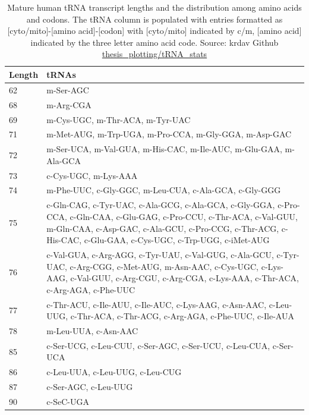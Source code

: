 \begin{table}[!htb]
\begin{tabular}{|l|p{}|}
\hline
Length & tRNAs \\ \hline
62     & m-Ser-AGC \\ \hline
68     & m-Arg-CGA \\ \hline
69     & m-Cys-UGC, m-Thr-ACA, m-Tyr-UAC \\ \hline
71     & m-Met-AUG, m-Trp-UGA, m-Pro-CCA, m-Gly-GGA, m-Asp-GAC \\ \hline
72     & m-Ser-UCA, m-Val-GUA, m-His-CAC, m-Ile-AUC, m-Glu-GAA, m-Ala-GCA \\ \hline
73     & c-Cys-UGC, m-Lys-AAA \\ \hline
74     & m-Phe-UUC, c-Gly-GGC, m-Leu-CUA, c-Ala-GCA, c-Gly-GGG \\ \hline
75     & c-Gln-CAG, c-Tyr-UAC, c-Ala-GCG, c-Ala-GCA, c-Gly-GGA, c-Pro-CCA,   c-Gln-CAA, c-Glu-GAG, c-Pro-CCU, c-Thr-ACA, c-Val-GUU, m-Gln-CAA, c-Asp-GAC,   c-Ala-GCU, c-Pro-CCG, c-Thr-ACG, c-His-CAC, c-Glu-GAA, c-Cys-UGC, c-Trp-UGG,   c-iMet-AUG \\ \hline
76     & c-Val-GUA, c-Arg-AGG, c-Tyr-UAU, c-Val-GUG, c-Ala-GCU, c-Tyr-UAC,   c-Arg-CGG, c-Met-AUG, m-Asn-AAC, c-Cys-UGC, c-Lys-AAG, c-Val-GUU, c-Arg-CGU,   c-Arg-CGA, c-Lys-AAA, c-Thr-ACA, c-Arg-AGA, c-Phe-UUC \\ \hline
77     & c-Thr-ACU, c-Ile-AUU, c-Ile-AUC, c-Lys-AAG, c-Asn-AAC, c-Leu-UUG,   c-Thr-ACA, c-Thr-ACG, c-Arg-AGA, c-Phe-UUC, c-Ile-AUA \\ \hline
78     & m-Leu-UUA, c-Asn-AAC \\ \hline
85     & c-Ser-UCG, c-Leu-CUU, c-Ser-AGC, c-Ser-UCU, c-Leu-CUA, c-Ser-UCA \\ \hline
86     & c-Leu-UUA, c-Leu-UUG, c-Leu-CUG \\ \hline
87     & c-Ser-AGC, c-Leu-UUG \\ \hline
90     & c-SeC-UGA \\ \hline
\end{tabular}
\caption{Mature human tRNA transcript lengths and the distribution among amino acids and codons. The tRNA column is populated with entries formatted as [cyto/mito]-[amino acid]-[codon] with [cyto/mito] indicated by c/m, [amino acid] indicated by the three letter amino acid code. Source: krdav Github \href{https://github.com/krdav/thesis_plotting/blob/main/tRNA_stats/plot_data.ipynb}{thesis\_plotting/tRNA\_stats}}
\end{table}
















